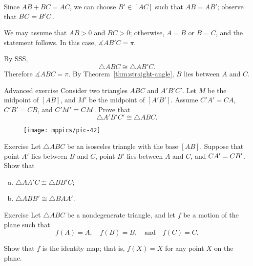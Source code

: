 Since $AB+BC=AC$, we can choose $B'\in [AC]$ such that $AB=AB'$;
observe that $BC=B'C$.

We may assume that $AB>0$ and $BC>0$;
otherwise, $A=B$ or $B=C$, and the statement follows.
In this case, $\measuredangle AB'C=\pi$.

By SSS, 
\[\triangle ABC\cong \triangle AB'C.\]
Therefore $\measuredangle ABC=\pi$.
By Theorem~\ref{thm:straight-angle}, $B$ lies between $A$ and $C$.
\qeds



\begin{thm}{Advanced exercise}\label{ex:SMS}
Consider two triangles $A B C$ and $A' B' C'$.
Let $M$ be the midpoint of $[A B]$, and
$M'$ be the midpoint of $[A' B']$.
Assume $C' A'=C A$, $C' B'= C B$, and $C' M'= C M$.
Prove that
\[\triangle A' B' C'\cong\triangle A B C.\]

\end{thm}

{

\begin{wrapfigure}[6]{r}{26mm}
\vskip-0mm
\centering
\texttt{[image: mppics/pic-42]}
\end{wrapfigure}

\begin{thm}{Exercise}\label{ex:isos-sides}
Let $\triangle A B C$ be an isosceles triangle with the base $[A B]$.
Suppose that point $A'$ lies between $B$ and $C$,
point $B'$ lies between $A$ and $C$,
and $C A'=C B'$.
Show that
\begin{enumerate}[(a)]
\item $\triangle A A' C\cong \triangle B B' C$;
\item $\triangle A B B'\cong \triangle B A A'$.
\end{enumerate}

\end{thm}

\begin{thm}{Exercise}\label{ex:ABC-motion}
Let $\triangle ABC$ be a nondegenerate triangle, and
let $f$ be a motion of the plane 
such that 
$$f(A)=A,
\quad 
f(B)=B,
\quad 
\text{and}
\quad
f(C)=C.$$

Show that $f$ is the identity map;
that is, $f(X)=X$ for any point $X$ on the plane.
\end{thm}

}



